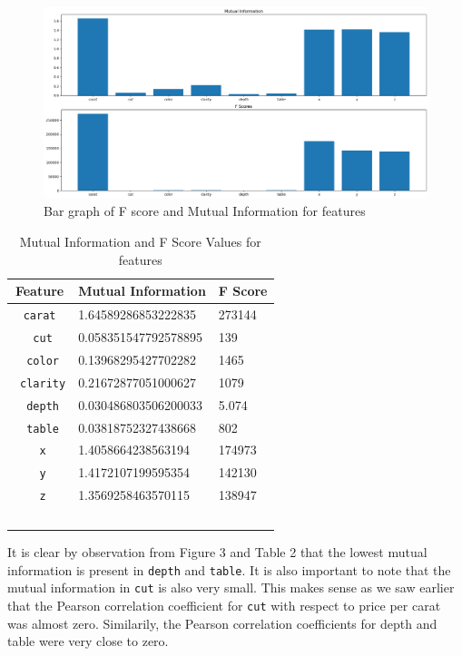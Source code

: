 \documentclass[11pt,letterpaper]{article}
\begin{document}
\begin{figure}[H]
    \centering
   \includegraphics[width=0.8\linewidth]{../Figures/Question2/mi.png}
   \caption{Bar graph of F score and Mutual Information for features}
\end{figure}
\begin{table}[!ht]
    \centering
    \begin{tabular}{c l l}
    \hline
        Feature & Mutual Information & F Score \\ \hline
        \texttt{carat} & 1.64589286853222835 & 273144 \\ \
        \texttt{cut} &0.058351547792578895 & 139 \\ \
        \texttt{color} &0.13968295427702282 & 1465 \\ \
        \texttt{clarity} & 0.21672877051000627 & 1079 \\ \
        \texttt{depth} & 0.030486803506200033 & 5.074 \\ \
        \texttt{table} & 0.03818752327438668 & 802 \\ \
        \texttt{x} & 1.4058664238563194 & 174973 \\ \
       \texttt{y} & 1.4172107199595354 & 142130 \\ \
        \texttt{z} & 1.3569258463570115 & 138947 \\ \
    \end{tabular}
    \caption{Mutual Information and F Score Values for features}
\end{table}
It is clear by observation from Figure 3 and Table 2 that the lowest mutual 
information is present in \texttt{depth} and \texttt{table}. It is also 
important to note that the mutual information in \texttt{cut} is also very small. 
This makes sense as we saw earlier that the Pearson correlation coefficient for 
\texttt{cut} with respect to price per carat was almost zero. Similarily, the 
Pearson correlation coefficients for depth and table were very close to zero. \\ 
\end{document}

